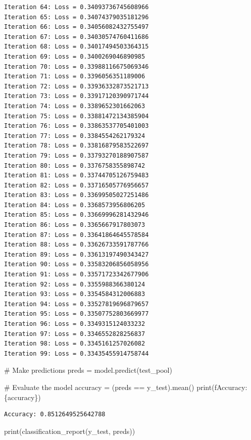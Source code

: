 \documentclass[
  letterpaper,
  DIV=11,
  numbers=noendperiod]{scrartcl}
\newenvironment{Shaded}{\begin{snugshade}}{\end{snugshade}}
\newcommand{\BuiltInTok}[1]{\textcolor[rgb]{0.00,0.23,0.31}{#1}}
\newcommand{\CommentTok}[1]{\textcolor[rgb]{0.37,0.37,0.37}{#1}}
\newcommand{\NormalTok}[1]{\textcolor[rgb]{0.00,0.23,0.31}{#1}}
\newcommand{\OperatorTok}[1]{\textcolor[rgb]{0.37,0.37,0.37}{#1}}
\newcommand{\SpecialCharTok}[1]{\textcolor[rgb]{0.37,0.37,0.37}{#1}}
\newcommand{\SpecialStringTok}[1]{\textcolor[rgb]{0.13,0.47,0.30}{#1}}
\begin{document}
\begin{verbatim}
Iteration 64: Loss = 0.34093736745608966
Iteration 65: Loss = 0.34074379035181296
Iteration 66: Loss = 0.34056082432755497
Iteration 67: Loss = 0.34030574760411686
Iteration 68: Loss = 0.34017494503364315
Iteration 69: Loss = 0.3400269046890985
Iteration 70: Loss = 0.33988116675069346
Iteration 71: Loss = 0.3396056351189006
Iteration 72: Loss = 0.33936332873521713
Iteration 73: Loss = 0.33917120390971744
Iteration 74: Loss = 0.3389652301662063
Iteration 75: Loss = 0.33881472134385904
Iteration 76: Loss = 0.33863537705401003
Iteration 77: Loss = 0.3384554262179324
Iteration 78: Loss = 0.33816879583522697
Iteration 79: Loss = 0.33793270188907587
Iteration 80: Loss = 0.3376758355898742
Iteration 81: Loss = 0.33744705126759483
Iteration 82: Loss = 0.33716505776956657
Iteration 83: Loss = 0.33699505027251486
Iteration 84: Loss = 0.3368573956806205
Iteration 85: Loss = 0.33669996281432946
Iteration 86: Loss = 0.3365667917803073
Iteration 87: Loss = 0.33641864645578584
Iteration 88: Loss = 0.33626733591787766
Iteration 89: Loss = 0.33613197490343427
Iteration 90: Loss = 0.33583206856058956
Iteration 91: Loss = 0.33571723342677906
Iteration 92: Loss = 0.3355988366380124
Iteration 93: Loss = 0.3354584312006883
Iteration 94: Loss = 0.33527819696879657
Iteration 95: Loss = 0.33507752803669977
Iteration 96: Loss = 0.3349315124033232
Iteration 97: Loss = 0.3346552828256837
Iteration 98: Loss = 0.3345161257026082
Iteration 99: Loss = 0.33435455914758744
\end{verbatim}

\begin{Shaded}
\begin{Highlighting}[]
\CommentTok{\# Make predictions}
\NormalTok{preds }\OperatorTok{=}\NormalTok{ model.predict(test\_pool)}

\CommentTok{\# Evaluate the model}
\NormalTok{accuracy }\OperatorTok{=}\NormalTok{ (preds }\OperatorTok{==}\NormalTok{ y\_test).mean()}
\BuiltInTok{print}\NormalTok{(}\SpecialStringTok{f\textquotesingle{}Accuracy: }\SpecialCharTok{\{}\NormalTok{accuracy}\SpecialCharTok{\}}\SpecialStringTok{\textquotesingle{}}\NormalTok{)}
\end{Highlighting}
\end{Shaded}

\begin{verbatim}
Accuracy: 0.8512649525642788
\end{verbatim}

\begin{Shaded}
\begin{Highlighting}[]
\BuiltInTok{print}\NormalTok{(classification\_report(y\_test, preds))}
\end{Highlighting}
\end{Shaded}
\end{document}
